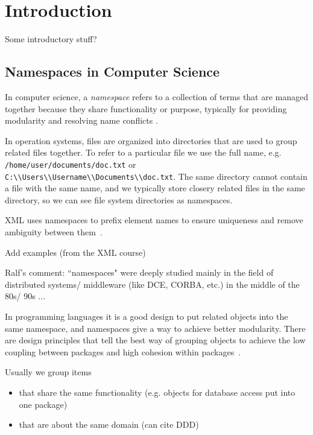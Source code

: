 \section{Introduction}

Some introductory stuff?

\subsection{Namespaces in Computer Science}

In computer science, a \emph{namespace} refers to a collection of terms that are managed
together because they share functionality or purpose, typically for providing modularity
and resolving name conflicts \cite{duval2002metadata}.


In operation systems, files are organized into directories that are used to group related
files together. To refer to a particular file we use the full name, e.g.
\verb|/home/user/documents/doc.txt| or \verb|C:\\Users\\Username\\Documents\\doc.txt|.
The same directory cannot contain a file with the same name, and we typically store closery
related files in the same directory, so we can see file system directories as namespaces.


XML uses namespaces to prefix element names to ensure uniqueness and remove
ambiguity between them~\cite{xmlnamespaces}.

Add examples (from the XML course)

Ralf's comment: ``namespaces" were deeply studied mainly in
the field of distributed systems/ middleware (like DCE, CORBA, etc.) in the middle
of the 80s/ 90s ...



In programming languages it is a good design to put related objects
into the same namespace, and namespaces give a way to achieve better modularity.
There are design principles that tell the best way of grouping objects to
achieve the low coupling between packages and high cohesion within packages~\cite{larman2005applying}.

Usually we group items

\begin{itemize}
  \item that share the same functionality  (e.g. objects for database access put into one package)
  \item that are about the same domain (can cite DDD)
\end{itemize}

